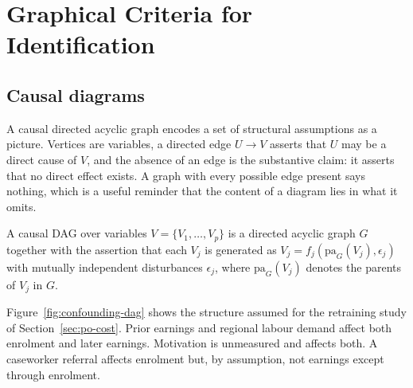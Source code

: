 \chapter{Graphical Criteria for Identification}
\label{chap:graphical}

\section{Causal diagrams}
\label{sec:graph-dags}

A causal directed acyclic graph encodes a set of
structural assumptions as a picture. Vertices are variables, a directed edge
$U \to V$ asserts that $U$ may be a direct cause of $V$, and the absence of an
edge is the substantive claim: it asserts that no direct effect exists. A graph
with every possible edge present says nothing, which is a useful reminder that
the content of a diagram lies in what it omits.

\begin{definition}
\label{def:dag}
A causal DAG over variables $V = \{V_1, \dots, V_p\}$ is a directed acyclic
graph $G$ together with the assertion that each $V_j$ is generated as
$V_j = f_j\left( \mathrm{pa}_G(V_j), \epsilon_j \right)$ with mutually
independent disturbances $\epsilon_j$, where $\mathrm{pa}_G(V_j)$ denotes the
parents of $V_j$ in $G$.
\end{definition}

Figure~\ref{fig:confounding-dag} shows the structure assumed for the retraining
study of Section~\ref{sec:po-cost}. Prior earnings and regional labour demand
affect both enrolment and later earnings. Motivation is unmeasured and affects
both. A caseworker referral affects enrolment but, by assumption, not earnings
except through enrolment.

